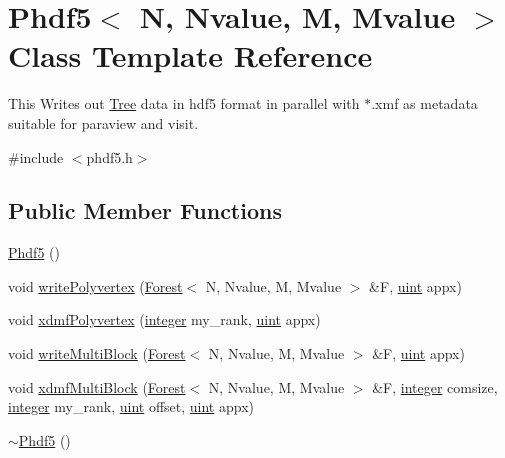 \hypertarget{classPhdf5}{}\section{Phdf5$<$ N, Nvalue, M, Mvalue $>$ Class Template Reference}
\label{classPhdf5}


This Writes out \mbox{\hyperlink{classTree}{Tree}} data in hdf5 format in parallel with $\ast$.xmf as metadata suitable for paraview and visit.  




{\ttfamily \#include $<$phdf5.\+h$>$}

\subsection*{Public Member Functions}
\begin{DoxyCompactItemize}
\item 
\mbox{\hyperlink{classPhdf5_afc8ea2b7a2dfa770d5dec38e8b9f8d91}{Phdf5}} ()
\item 
void \mbox{\hyperlink{classPhdf5_a09da9d5b8a098327ed178237532f99c9}{write\+Polyvertex}} (\mbox{\hyperlink{classForest}{Forest}}$<$ N, Nvalue, M, Mvalue $>$ \&F, \mbox{\hyperlink{definitions_8h_a69aa29b598b851b0640aa225a9e5d61d}{uint}} appx)
\item 
void \mbox{\hyperlink{classPhdf5_afb34f940fb0ca36971a73a09800c388a}{xdmf\+Polyvertex}} (\mbox{\hyperlink{definitions_8h_adbd822dbdb8152553a0f77b84915bd8d}{integer}} my\+\_\+rank, \mbox{\hyperlink{definitions_8h_a69aa29b598b851b0640aa225a9e5d61d}{uint}} appx)
\item 
void \mbox{\hyperlink{classPhdf5_aae8557e831c06005dd887d04073a171d}{write\+Multi\+Block}} (\mbox{\hyperlink{classForest}{Forest}}$<$ N, Nvalue, M, Mvalue $>$ \&F, \mbox{\hyperlink{definitions_8h_a69aa29b598b851b0640aa225a9e5d61d}{uint}} appx)
\item 
void \mbox{\hyperlink{classPhdf5_a6f869e6df79d216b7746b35869b8d82f}{xdmf\+Multi\+Block}} (\mbox{\hyperlink{classForest}{Forest}}$<$ N, Nvalue, M, Mvalue $>$ \&F, \mbox{\hyperlink{definitions_8h_adbd822dbdb8152553a0f77b84915bd8d}{integer}} comsize, \mbox{\hyperlink{definitions_8h_adbd822dbdb8152553a0f77b84915bd8d}{integer}} my\+\_\+rank, \mbox{\hyperlink{definitions_8h_a69aa29b598b851b0640aa225a9e5d61d}{uint}} offset, \mbox{\hyperlink{definitions_8h_a69aa29b598b851b0640aa225a9e5d61d}{uint}} appx)
\item 
\mbox{\hyperlink{classPhdf5_aeff77d62aae395bc368d2baa132ac3f0}{$\sim$\+Phdf5}} ()
\end{DoxyCompactItemize}
